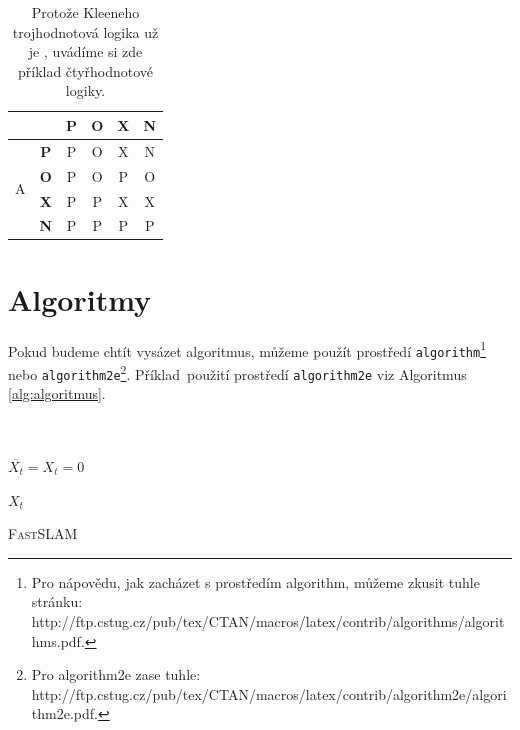 \documentclass[11pt, a4paper]{article}
\begin{document}
\begin{table}[h]
\begin{tabular}{|c|c|c|c|c|c|}
        \cline{3-6}
         \multicolumn{2}{|c|}{} & \textbf{P} & \textbf{O} & \textbf{X} & \textbf{N} \\
         \hline
         \multirow{4}{*}{A} & \textbf{P} & P & O & X & N\\
         \cline{2-6}
         & \textbf{O} & P & O & P & O\\
         \cline{2-6}
         & \textbf{X} & P & P & X & X\\
         \cline{2-6}
         & \textbf{N} & P & P & P & P\\
         \cline{1-6}
    \end{tabular}
    \caption{Protože Kleeneho trojhodnotová logika už je , uvádíme si zde příklad čtyřhodnotové logiky.}
    \label{tab:my_label2}
\end{table}

\newpage
\section{Algoritmy} \label{sekce3}

Pokud budeme chtít vysázet algoritmus, můžeme použít prostředí 
\verb|algorithm|\footnote{\indent Pro nápovědu, jak zacházet s prostředím algorithm, můžeme zkusit tuhle stránku:\\
http://ftp.cstug.cz/pub/tex/CTAN/macros/latex/contrib/algorithms/algorithms.pdf.} nebo \verb|algorithm2e|\footnote{\indent Pro algorithm2e zase tuhle:
http://ftp.cstug.cz/pub/tex/CTAN/macros/latex/contrib/algorithm2e/algorithm2e.pdf.}.
\mbox{Příklad}~použití prostředí \verb|algorithm2e| viz Algoritmus \ref{alg:algoritmus}.
\\\\\\
\IncMargin{1.5em}
\begin{algorithm}[H]
\label{alg:algoritmus}
\SetAlgoLined
\Indm
{} 
    
\Indp
\BlankLine
$\overline{X_t} = X_t = 0$
\SetAlgoNoLine



\Return $X_t$


    
\caption{\textsc{FastSLAM}}
\end{algorithm}
\DecMargin{1.5em}
\end{document}
